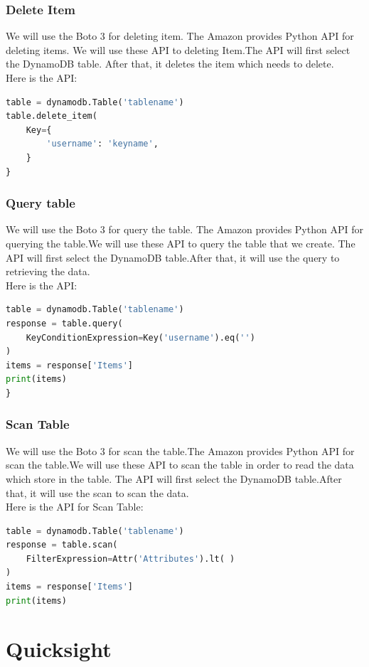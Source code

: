     \subsubsection{Delete Item}
    We will use the Boto 3 for deleting item. The Amazon provides Python API for deleting items. We will use these API to deleting Item.The API will first select the DynamoDB table. After that, it deletes the item which needs to delete.\\
Here is the API\cite{w1}:
\begin{lstlisting}[language=Python, caption=API for delete data]
table = dynamodb.Table('tablename')
table.delete_item(
    Key={
        'username': 'keyname',
    }
}
\end{lstlisting}
    \subsubsection{Query table}
    We will use the Boto 3 for query the table. The Amazon provides Python API for querying the table.We will use these API to query the table that we create. The API will first select the DynamoDB table.After that, it will use the query to retrieving the data.\\
Here is the API\cite{w1}:
\begin{lstlisting}[language=Python, caption=API for query table]
table = dynamodb.Table('tablename')
response = table.query(
	KeyConditionExpression=Key('username').eq('')
)
items = response['Items']
print(items)
}
\end{lstlisting}
    \subsubsection{Scan Table}
    We will use the Boto 3 for scan the table.The Amazon provides  Python API for scan the table.We will use these API to scan the table in order to read the data which store in the table. The API will first select the DynamoDB table.After that, it will use the scan to scan the data.\\
    Here is the API for Scan Table\cite{w1}:
\begin{lstlisting}[language=Python, caption=API for scan table]
table = dynamodb.Table('tablename')
response = table.scan(
    FilterExpression=Attr('Attributes').lt( )
)
items = response['Items']
print(items)
\end{lstlisting}

 \section{Quicksight}
